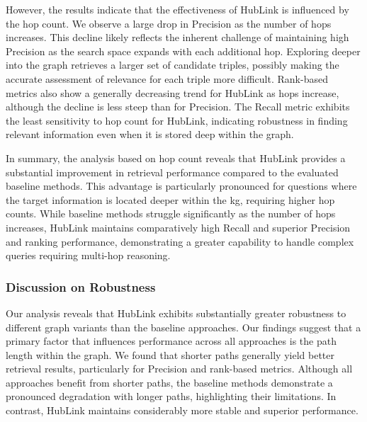 However, the results indicate that the effectiveness of HubLink is influenced by the hop count. We observe a large drop in Precision as the number of hops increases. This decline likely reflects the inherent challenge of maintaining high Precision as the search space expands with each additional hop. Exploring deeper into the graph retrieves a larger set of candidate triples, possibly making the accurate assessment of relevance for each triple more difficult. Rank-based metrics also show a generally decreasing trend for HubLink as hops increase, although the decline is less steep than for Precision. The Recall metric exhibits the least sensitivity to hop count for HubLink, indicating robustness in finding relevant information even when it is stored deep within the graph.

In summary, the analysis based on hop count reveals that HubLink provides a substantial improvement in retrieval performance compared to the evaluated baseline methods. This advantage is particularly pronounced for questions where the target information is located deeper within the \gls{kg}, requiring higher hop counts. While baseline methods struggle significantly as the number of hops increases, HubLink maintains comparatively high Recall and superior Precision and ranking performance, demonstrating a greater capability to handle complex queries requiring multi-hop reasoning.


\subsubsection{Discussion on Robustness}

Our analysis reveals that HubLink exhibits substantially greater robustness to different graph variants than the baseline approaches. Our findings suggest that a primary factor that influences performance across all approaches is the path length within the graph. We found that shorter paths generally yield better retrieval results, particularly for Precision and rank-based metrics. Although all approaches benefit from shorter paths, the baseline methods demonstrate a pronounced degradation with longer paths, highlighting their limitations. In contrast, HubLink maintains considerably more stable and superior performance.

